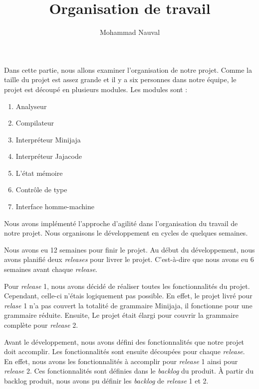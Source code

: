 \documentclass[a4paper,12pt]{article}
\title{Organisation de travail}
\author{Mohammad Nauval}
\begin{document}
\maketitle

Dans cette partie, nous allons examiner l'organisation de notre projet. Comme la taille du projet est assez grande et il y a six personnes dans notre équipe, le projet est découpé en plusieurs modules. Les modules sont :

\begin{enumerate}
	\item Analyseur
	\item Compilateur
	\item Interpréteur Minijaja
	\item Interpréteur Jajacode
	\item L'état mémoire
	\item Contrôle de type
	\item Interface homme-machine
\end{enumerate}

Nous avons implémenté l'approche d'agilité dans l'organisation du travail de notre projet. Nous organisons le développement en cycles de quelques semaines. 

Nous avons eu 12 semaines pour finir le projet. Au début du développement, nous avons planifié deux \textit{releases} pour livrer le projet. C'est-à-dire que nous avons eu 6 semaines avant chaque \textit{release}.  

Pour \textit{release} 1, nous avons décidé de réaliser toutes les fonctionnalités du projet. Cependant, celle-ci n'étais logiquement pas possible. En effet, le projet livré pour \textit{relase} 1 n'a pas couvert la totalité de grammaire Minijaja, il fonctionne pour une grammaire réduite. Ensuite, Le projet était élargi pour couvrir la grammaire complète pour \textit{release} 2.

Avant le développement, nous avons défini des fonctionnalités que notre projet doit accomplir. Les fonctionnalités sont ensuite découpées pour chaque \textit{release}. En effet, nous avons les fonctionnalités à accomplir pour \textit{release} 1 ainsi pour \textit{release} 2. Ces fonctionnalités sont définies dans le \textit{backlog} du produit. À partir du backlog produit, nous avons pu définir les \textit{backlog} de \textit{release} 1 et 2.
\end{document}
